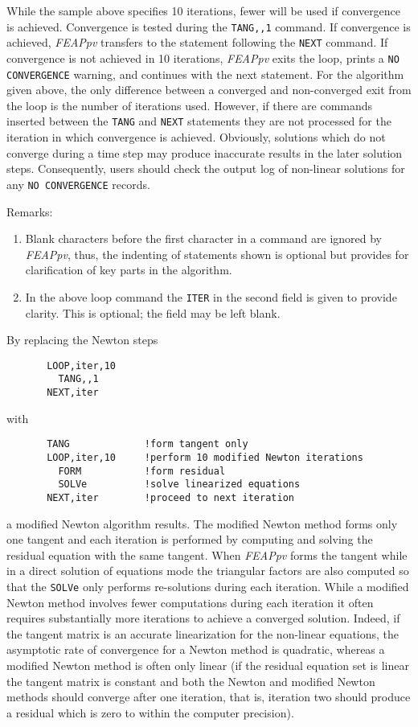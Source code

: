 While the sample above specifies 10 iterations, fewer will be used if
convergence is achieved.  Convergence is tested during the {\tt TANG,,1}
command.  If convergence is achieved, {\sl FEAPpv} transfers to the
statement following the {\tt NEXT} command.
If convergence is not achieved in 10 iterations, {\sl FEAPpv}
exits the loop, prints a {\tt NO CONVERGENCE} warning,
and continues with the next statement.
For the algorithm given above, the only difference between a converged
and non-converged exit from the loop is the number of iterations
used.  However, if there are commands inserted between the {\tt TANG} and
{\tt NEXT} statements they are not processed for the iteration in which
convergence is achieved.
Obviously, solutions which do not converge during a time step may produce
inaccurate results in the later solution steps.
Consequently, users should check the output log of non-linear solutions
for any {\tt NO CONVERGENCE} records.

Remarks:
\begin{enumerate}
\item
Blank characters before the first character in a command are ignored
by {\sl FEAPpv}, thus,
the indenting of statements shown is optional but provides for clarification
of key parts in the algorithm.

\item
In the above loop command the {\tt ITER} in the
second field is given to provide clarity.  This is
optional; the field may be left blank.
\end{enumerate}

By replacing the Newton steps
\begin{verbatim}
       LOOP,iter,10
         TANG,,1
       NEXT,iter
\end{verbatim}
with
\begin{verbatim}
       TANG             !form tangent only
       LOOP,iter,10     !perform 10 modified Newton iterations
         FORM           !form residual
         SOLVe          !solve linearized equations
       NEXT,iter        !proceed to next iteration
\end{verbatim}
a modified Newton algorithm results.  The modified Newton method
forms only one tangent
and each iteration is performed by computing and solving the residual equation
with the same tangent.  When {\sl FEAPpv} forms the tangent while in a
direct solution
of equations mode the triangular factors are also computed
so that the {\tt SOLVe} only performs re-solutions during
each iteration.  While a modified Newton method involves fewer computations
during each iteration it often
requires substantially more iterations to achieve a
converged solution.  Indeed, if the tangent matrix is an accurate linearization
for the non-linear equations, the asymptotic rate of convergence for a
Newton method is quadratic, whereas a modified Newton method is often
only linear (if the residual equation set
is linear the tangent matrix is constant
and both the Newton and modified Newton methods should converge after one
iteration, that is, iteration two should produce a residual which is
zero to within the computer precision).


